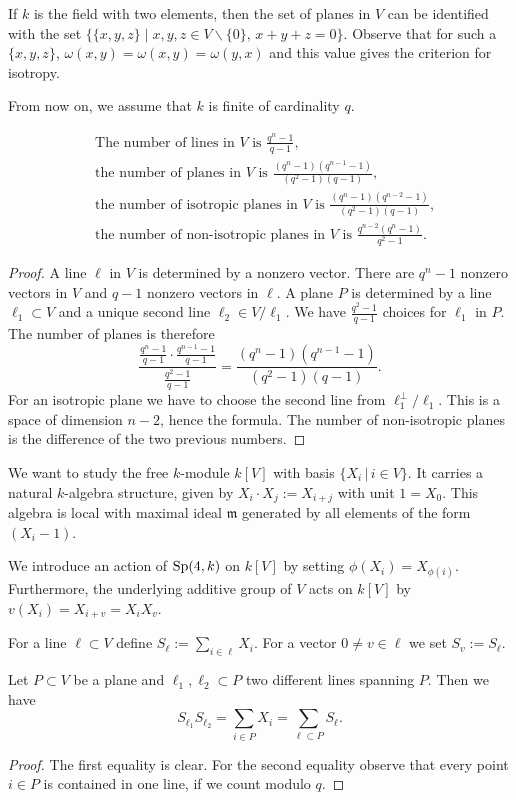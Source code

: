 \begin{remark} \label{PlaneTriple}
 If $k$ is the field with two elements, then the set of planes in $V$ can be identified with the set $\{\{x,y,z\}\;|\;x,y,z\in V\backslash\{0\},\,x+y+z=0\}$. Observe that for such a $\{x,y,z\}$, $\omega(x,y)=\omega(x,y)=\omega(y,x)$ and this value gives the criterion for isotropy.
\end{remark}
From now on, we assume that $k$ is finite of cardinality $q$.
\begin{proposition}\label{OrbitesSp}
\begin{align}
&\text{The number of lines in $V$ is }\frac{q^n-1}{q-1}, \\
&\text{the number of planes in $V$ is }\frac{(q^n-1)(q^{n-1}-1)}{(q^2-1)(q-1)}, \\
&\text{the number of isotropic planes in $V$ is }\frac{(q^n-1)(q^{n-2}-1)}{(q^2-1)(q-1)}, \\
&\text{the number of non-isotropic planes in $V$ is }\frac{q^{n-2}(q^n-1)}{q^2-1}.
\end{align}
\end{proposition}
\begin{proof}
A line $\ell$ in $V$ is determined by a nonzero vector. There are $q^n - 1$ nonzero vectors in $V$ and $q-1$ nonzero vectors in $\ell$. A plane $P$ is determined by a line $\ell_1 \subset V$ and a unique second line $\ell_2\in V/\ell_1$. We have $\frac{q^2-1}{q-1}$ choices for $\ell_1$ in $P$. The number of planes is therefore
$$
\frac{ \frac{q^n-1}{q-1} \cdot\frac{q^{n-1}-1}{q-1}}{\frac{q^2-1}{q-1} } = \frac{(q^n-1)(q^{n-1}-1)}{(q^2-1)(q-1)}.
$$
For an isotropic plane we have to choose the second line from $\ell_1^\perp/\ell_1$. This is a space of dimension $n-2$, hence the formula. The number of non-isotropic planes is the difference of the two previous numbers.
\end{proof}

We want to study the free $k$-module $k[V]$ with basis $\{X_i \,|\, i\in V\}$. It carries a natural $k$-algebra structure, given by
$X_i\cdot X_j := X_{i+j}$ with unit $1=X_0$. This algebra is local with maximal ideal $\mathfrak m$ generated by all elements of the form $(X_i-1)$.

We introduce an action of $\operatorname{Sp} (4,k)$ on $k[V]$ by setting $\phi(X_i) = X_{\phi(i)}$. Furthermore, the underlying additive group of $V$ acts on $k[V]$ by $v( X_i) = X_{i+v} =X_iX_v$. 
\begin{definition}
For a line $\ell\subset V$ define $S_\ell := \sum_{i\in\ell} X_i$. For a vector $0\neq v\in \ell$ we set $S_v:=S_\ell$.
\end{definition}
\begin{lemma}\label{SympLemma}
Let $P\subset V$ be a plane and $\ell_1,\ell_2\subset P$ two different lines spanning $P$. Then we have
$$
S_{\ell_1}S_{\ell_2}=\sum_{i\in P}X_i = \sum_{\ell\subset P}S_\ell.
$$
\end{lemma}
\begin{proof}
The first equality is clear. For the second equality observe that every point $i\in P$ is contained in one line, if we count modulo $q$.
\end{proof}


